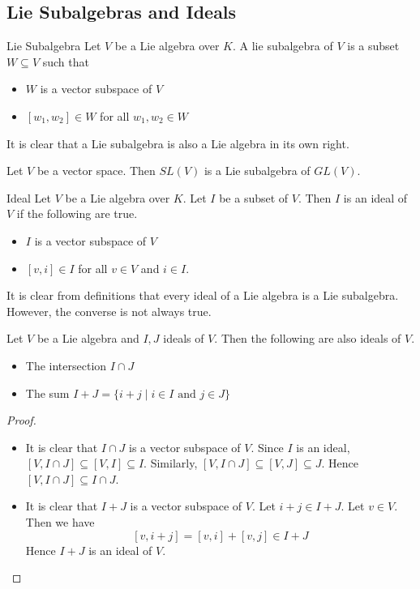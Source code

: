 \documentclass[a4paper]{article}
\begin{document}
\subsection{Lie Subalgebras and Ideals}
\begin{defn}{Lie Subalgebra}{} Let $V$ be a Lie algebra over $K$. A lie subalgebra of $V$ is a subset $W\subseteq V$ such that 
\begin{itemize}
\item $W$ is a vector subspace of $V$
\item $[w_1,w_2]\in W$ for all $w_1,w_2\in W$
\end{itemize}
\end{defn}

It is clear that a Lie subalgebra is also a Lie algebra in its own right. 

\begin{eg}{}{} Let $V$ be a vector space. Then $SL(V)$ is a Lie subalgebra of $GL(V)$. 
\end{eg}

\begin{defn}{Ideal}{} Let $V$ be a Lie algebra over $K$. Let $I$ be a subset of $V$. Then $I$ is an ideal of $V$ if the following are true. 
\begin{itemize}
\item $I$ is a vector subspace of $V$
\item $[v,i]\in I$ for all $v\in V$ and $i\in I$. 
\end{itemize}
\end{defn}

It is clear from definitions that every ideal of a Lie algebra is a Lie subalgebra. However, the converse is not always true. 

\begin{prp}{}{} Let $V$ be a Lie algebra and $I,J$ ideals of $V$. Then the following are also ideals of $V$. 
\begin{itemize}
\item The intersection $I\cap J$
\item The sum $I+J=\{i+j\;|\;i\in I\text{ and }j\in J\}$
\end{itemize} \tcbline
\begin{proof}~\\
\begin{itemize}
\item It is clear that $I\cap J$ is a vector subspace of $V$. Since $I$ is an ideal, $[V,I\cap J]\subseteq [V,I]\subseteq I$. Similarly, $[V,I\cap J]\subseteq[V,J]\subseteq J$. Hence $[V,I\cap J]\subseteq I\cap J$. 
\item It is clear that $I+J$ is a vector subspace of $V$. Let $i+j\in I+J$. Let $v\in V$. Then we have $$[v,i+j]=[v,i]+[v,j]\in I+J$$ Hence $I+J$ is an ideal of $V$. 
\end{itemize}
\end{proof}
\end{prp}
\end{document}
